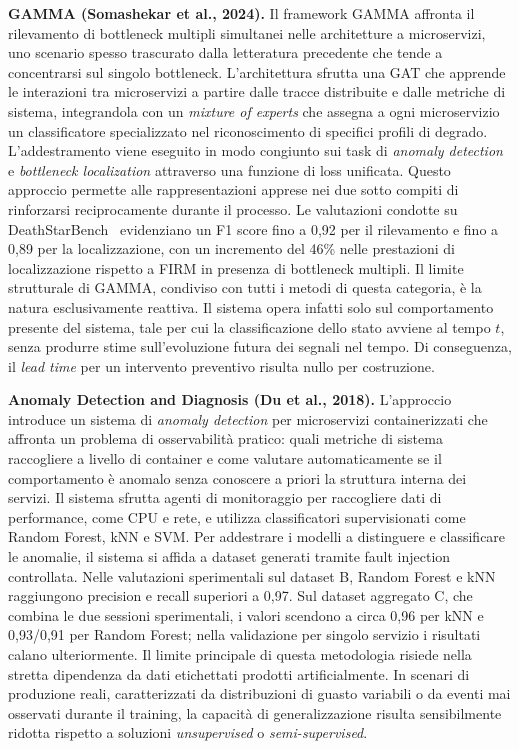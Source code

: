 \textbf{GAMMA (Somashekar et al., 2024).} Il framework GAMMA affronta il rilevamento di bottleneck multipli simultanei nelle architetture 
a microservizi, uno scenario spesso trascurato dalla letteratura precedente che tende a concentrarsi 
sul singolo bottleneck. L'architettura sfrutta una \gls{GAT} che apprende le interazioni tra microservizi 
a partire dalle tracce distribuite e dalle metriche di sistema, integrandola con un \emph{mixture of experts} 
che assegna a ogni microservizio un classificatore specializzato nel riconoscimento di specifici profili di degrado. 
L'addestramento viene eseguito in modo congiunto sui task di \emph{anomaly detection} e \emph{bottleneck localization} 
attraverso una funzione di loss unificata. Questo approccio permette alle rappresentazioni apprese nei due 
sotto compiti di rinforzarsi reciprocamente durante il processo. Le valutazioni condotte su DeathStarBench~\cite{gan2019deathstar} 
evidenziano un F1 score fino a 0,92 per il rilevamento e fino a 0,89 per la localizzazione, 
con un incremento del 46\% nelle prestazioni di localizzazione rispetto a FIRM in presenza di bottleneck multipli. 
Il limite strutturale di GAMMA, condiviso con tutti i metodi di questa categoria, è la natura esclusivamente reattiva. 
Il sistema opera infatti solo sul comportamento presente del sistema, tale per cui la classificazione dello 
stato avviene al tempo $t$, senza produrre stime sull'evoluzione futura dei segnali nel tempo. Di conseguenza, 
il \emph{lead time} per un intervento preventivo risulta nullo per costruzione.

\textbf{Anomaly Detection and Diagnosis (Du et al., 2018).} L'approccio~\cite{du2018} introduce un 
sistema di \emph{anomaly detection} per microservizi containerizzati che affronta un problema di osservabilità pratico: 
quali metriche di sistema raccogliere a livello di container e come valutare automaticamente se il comportamento 
è anomalo senza conoscere a priori la struttura interna dei servizi. Il sistema sfrutta agenti di 
monitoraggio per raccogliere dati di performance, come \gls{CPU} e rete, e utilizza classificatori 
supervisionati come Random Forest, \gls{kNN} e \gls{SVM}. Per addestrare i modelli a distinguere e classificare le anomalie, 
il sistema si affida a dataset generati tramite fault injection controllata. 
Nelle valutazioni sperimentali sul dataset B, Random Forest e kNN raggiungono precision e recall superiori a 0,97. 
Sul dataset aggregato C, che combina le due sessioni sperimentali, i valori scendono a circa 0,96 per kNN e 0,93/0,91 
per Random Forest; nella validazione per singolo servizio i risultati calano ulteriormente. 
Il limite principale di questa metodologia risiede nella stretta dipendenza da dati etichettati prodotti artificialmente. 
In scenari di produzione reali, caratterizzati da distribuzioni di guasto variabili o da eventi mai 
osservati durante il training, la capacità di generalizzazione risulta sensibilmente ridotta rispetto a soluzioni 
\textit{unsupervised} o \textit{semi-supervised}.


